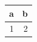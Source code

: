 \documentclass[11pt]{article}
\author{root}
\date{\today}
\title{}
\begin{document}
\tableofcontents

\begin{center}
\begin{tabular}{rr}
a & b\\[0pt]
\hline
1 & 2\\[0pt]
\end{tabular}
\end{center}
\end{document}
